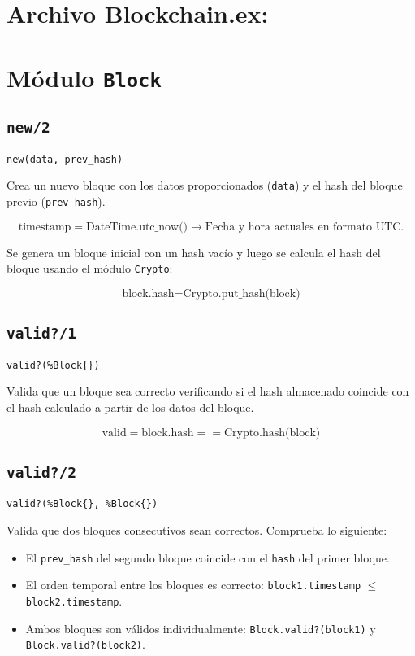 \large{
\section*{Archivo \textbf{Blockchain.ex}:}
\section*{Módulo \texttt{Block}}

\subsection*{\texttt{new/2}}
\begin{verbatim}
new(data, prev_hash)
\end{verbatim}

Crea un nuevo bloque con los datos proporcionados (\texttt{data}) y el hash del bloque previo (\texttt{prev\_hash}).

\[
\text{timestamp} = \text{DateTime.utc\_now()} \rightarrow \text{Fecha y hora actuales en formato UTC.}
\]

Se genera un bloque inicial con un hash vacío y luego se calcula el hash del bloque usando el módulo \texttt{Crypto}:

\[
\text{block.hash} = \text{Crypto.put\_hash(block)}
\]

\subsection*{\texttt{valid?/1}}
\begin{verbatim}
valid?(%Block{})
\end{verbatim}

Valida que un bloque sea correcto verificando si el hash almacenado coincide con el hash calculado a partir de los datos del bloque.

\[
\text{valid} = \text{block.hash} == \text{Crypto.hash(block)}
\]

\subsection*{\texttt{valid?/2}}
\begin{verbatim}
valid?(%Block{}, %Block{})
\end{verbatim}

Valida que dos bloques consecutivos sean correctos. Comprueba lo siguiente:

\begin{itemize}
    \item El \texttt{prev\_hash} del segundo bloque coincide con el \texttt{hash} del primer bloque.
    \item El orden temporal entre los bloques es correcto: \texttt{block1.timestamp} $\leq$ \texttt{block2.timestamp}.
    \item Ambos bloques son válidos individualmente: \texttt{Block.valid?(block1)} y \texttt{Block.valid?(block2)}.
\end{itemize}

}
